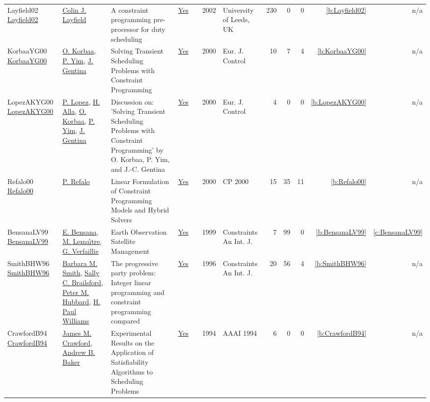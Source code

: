 {\begin{longtable}{>{\raggedright\arraybackslash}p{3cm}>{\raggedright\arraybackslash}p{6cm}>{\raggedright\arraybackslash}p{6.5cm}rrrp{2.5cm}rrrrr}
Layfield02 \href{http://etheses.whiterose.ac.uk/1301/}{Layfield02} & \hyperref[auth:a676]{Colin J. Layfield} & A constraint programming pre-processor for duty scheduling & \href{../works/Layfield02.pdf}{Yes} & \cite{Layfield02} & 2002 & University of Leeds, {UK} & 230 & 0 & 0 & \ref{b:Layfield02} & n/a\\
KorbaaYG00 \href{https://doi.org/10.1016/S0947-3580(00)71113-7}{KorbaaYG00} & \hyperref[auth:a686]{O. Korbaa}, \hyperref[auth:a687]{P. Yim}, \hyperref[auth:a688]{J. Gentina} & Solving Transient Scheduling Problems with Constraint Programming & \href{../works/KorbaaYG00.pdf}{Yes} & \cite{KorbaaYG00} & 2000 & Eur. J. Control & 10 & 7 & 4 & \ref{b:KorbaaYG00} & n/a\\
LopezAKYG00 \href{https://doi.org/10.1016/S0947-3580(00)71114-9}{LopezAKYG00} & \hyperref[auth:a3]{P. Lopez}, \hyperref[auth:a689]{H. Alla}, \hyperref[auth:a686]{O. Korbaa}, \hyperref[auth:a687]{P. Yim}, \hyperref[auth:a688]{J. Gentina} & Discussion on: 'Solving Transient Scheduling Problems with Constraint Programming' by O. Korbaa, P. Yim, and {J.-C.} Gentina & \href{../works/LopezAKYG00.pdf}{Yes} & \cite{LopezAKYG00} & 2000 & Eur. J. Control & 4 & 0 & 0 & \ref{b:LopezAKYG00} & n/a\\
Refalo00 \href{https://doi.org/10.1007/3-540-45349-0_27}{Refalo00} & \hyperref[auth:a256]{P. Refalo} & Linear Formulation of Constraint Programming Models and Hybrid Solvers & \href{../works/Refalo00.pdf}{Yes} & \cite{Refalo00} & 2000 & CP 2000 & 15 & 35 & 11 & \ref{b:Refalo00} & n/a\\
BensanaLV99 \href{https://doi.org/10.1023/A:1026488509554}{BensanaLV99} & \hyperref[auth:a172]{E. Bensana}, \hyperref[auth:a173]{M. Lema{\^{\i}}tre}, \hyperref[auth:a174]{G. Verfaillie} & Earth Observation Satellite Management & \href{../works/BensanaLV99.pdf}{Yes} & \cite{BensanaLV99} & 1999 & Constraints An Int. J. & 7 & 99 & 0 & \ref{b:BensanaLV99} & \ref{c:BensanaLV99}\\
SmithBHW96 \href{http://dx.doi.org/10.1007/bf00143880}{SmithBHW96} & \hyperref[auth:a1068]{Barbara M. Smith}, \hyperref[auth:a1066]{Sally C. Brailsford}, \hyperref[auth:a1199]{Peter M. Hubbard}, \hyperref[auth:a1200]{H. Paul Williams} & The progressive party problem: Integer linear programming and constraint programming compared & \href{../works/SmithBHW96.pdf}{Yes} & \cite{SmithBHW96} & 1996 & Constraints An Int. J. & 20 & 56 & 4 & \ref{b:SmithBHW96} & n/a\\
CrawfordB94 \href{http://www.aaai.org/Library/AAAI/1994/aaai94-168.php}{CrawfordB94} & \hyperref[auth:a1301]{James M. Crawford}, \hyperref[auth:a1302]{Andrew B. Baker} & Experimental Results on the Application of Satisfiability Algorithms to Scheduling Problems & \href{../works/CrawfordB94.pdf}{Yes} & \cite{CrawfordB94} & 1994 & AAAI 1994 & 6 & 0 & 0 & \ref{b:CrawfordB94} & n/a\\

\end{longtable}}
